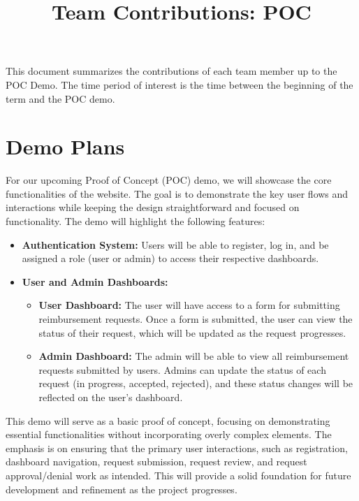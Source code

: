 \documentclass{article}
\title{Team Contributions: POC\\\progname}
\author{\authname}
\date{}
\begin{document}
\maketitle

This document summarizes the contributions of each team member up to the POC
Demo.  The time period of interest is the time between the beginning of the term
and the POC demo.

\section{Demo Plans}

For our upcoming Proof of Concept (POC) demo, we will showcase the core functionalities of the website. The goal is to demonstrate the key user flows and interactions while keeping the design straightforward and focused on functionality. The demo will highlight the following features:

\begin{itemize}
    \item \textbf{Authentication System:} Users will be able to register, log in, and be assigned a role (user or admin) to access their respective dashboards.
    
    \item \textbf{User and Admin Dashboards:}
    \begin{itemize}
        \item \textbf{User Dashboard:} The user will have access to a form for submitting reimbursement requests. Once a form is submitted, the user can view the status of their request, which will be updated as the request progresses.
        
        \item \textbf{Admin Dashboard:} The admin will be able to view all reimbursement requests submitted by users. Admins can update the status of each request (in progress, accepted, rejected), and these status changes will be reflected on the user’s dashboard.
    \end{itemize}
\end{itemize}

This demo will serve as a basic proof of concept, focusing on demonstrating essential functionalities without incorporating overly complex elements. The emphasis is on ensuring that the primary user interactions, such as registration, dashboard navigation, request submission, request review, and request approval/denial work as intended. This will provide a solid foundation for future development and refinement as the project progresses.
\end{document}
